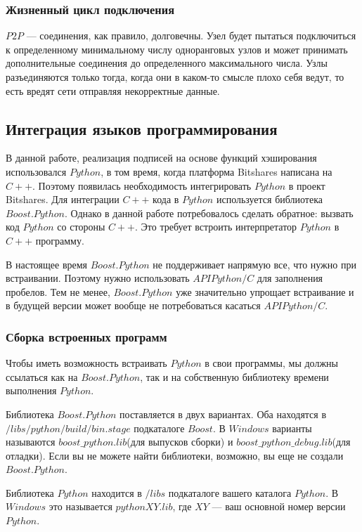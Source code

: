 \documentclass[a4paper, 14pt]{extarticle}
\begin{document}
\subsubsection{Жизненный цикл подключения}
$P2P$ --- соединения, как правило, долговечны. Узел будет пытаться подключиться к определенному минимальному числу одноранговых узлов и может принимать дополнительные соединения до определенного максимального числа. Узлы разъединяются только тогда, когда они в каком-то смысле плохо себя ведут, то есть вредят сети отправляя некорректные данные.

\subsection{Интеграция языков программирования}
В данной работе, реализация подписей на основе функций хэширования использовался $Python$, в том время, когда платформа Bitshares написана на $C++$. Поэтому появилась необходимость интегрировать $Python$ в проект Bitshares.
Для интеграции $C++$ кода в $Python$ используется библиотека $Boost.Python$. Однако в данной работе потребовалось сделать обратное: вызвать код $Python$ со стороны $C++$. Это требует встроить интерпретатор $Python$ в $C++$ программу.

В настоящее время $Boost.Python$ не поддерживает напрямую все, что нужно при встраивании. Поэтому нужно использовать $API Python / C$ для заполнения пробелов. Тем не менее, $Boost.Python$ уже значительно упрощает встраивание и в будущей версии может вообще не потребоваться касаться $API Python / C$.

\subsubsection{Сборка встроенных программ}
Чтобы иметь возможность встраивать $Python$ в свои программы, мы должны ссылаться как на $Boost.Python$, так и на собственную библиотеку времени выполнения $Python$.

Библиотека $Boost.Python$ поставляется в двух вариантах. Оба находятся в $/libs/python/build/bin.stage$ подкаталоге $Boost$. В $Windows$ варианты называются $boost\_python.lib$(для выпусков сборки) и $boost\_python\_debug.lib$(для отладки). Если вы не можете найти библиотеки, возможно, вы еще не создали $Boost.Python$.

Библиотека $Python$ находится в $/libs$ подкаталоге вашего каталога $Python$. В $Windows$ это называется $pythonXY.lib$, где $XY$ --- ваш основной номер версии $Python$.
\end{document}
